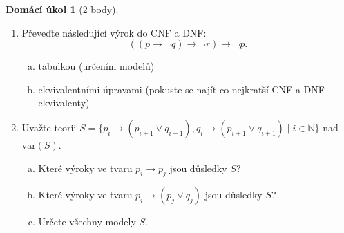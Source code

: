 \documentclass[a4paper]{article}
\theoremstyle{definition}
\newtheorem*{ukol}{Domácí úkol}
\begin{document}
\medskip\begin{ukol}[2 body]
\begin{enumerate}[1.]
    \item Převeďte následující výrok do CNF a DNF:
    $$
    ((p\to \neg q) \to \neg r) \to \neg p.
    $$
    \begin{enumerate}[(a)]
        \item tabulkou (určením modelů)
        \item ekvivalentními úpravami (pokuste se najít co nejkratší CNF a DNF ekvivalenty)
    \end{enumerate}
    \item Uvažte  teorii $S=\{p_i \to (p_{i+1} \vee q_{i+1}), q_i \to (p_{i+1} \vee q_{i+1}) \mid i\in \mathbb{N}\}$ nad $\mathrm{var}(S)$.
    \begin{enumerate}[(a)]
            \item Které výroky ve tvaru  $p_i \to p_j$ jsou důsledky $S$?
            \item Které výroky ve tvaru  $p_i \to (p_j \vee q_j)$ jsou důsledky $S$?
            \item Určete všechny modely $S$.
    \end{enumerate}
\end{enumerate} 
\end{ukol}
\end{document}

